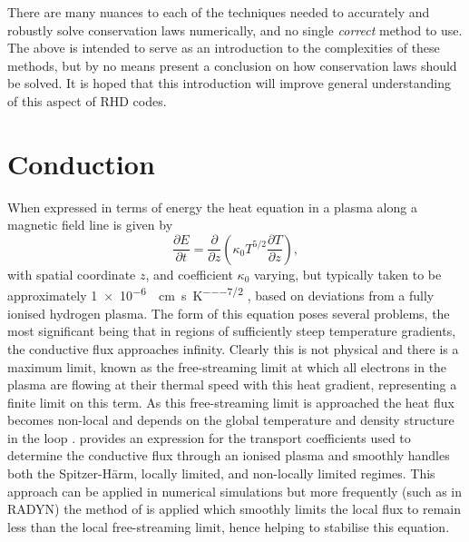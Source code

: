 There are many nuances to each of the techniques needed to accurately and robustly solve conservation laws numerically, and no single \emph{correct} method to use.
The above is intended to serve as an introduction to the complexities of these methods, but by no means present a conclusion on how conservation laws should be solved.
It is hoped that this introduction will improve general understanding of this aspect of RHD codes.

\section{Conduction}

When expressed in terms of energy the heat equation in a plasma along a magnetic field line is given by
\begin{equation}
    \frac{\partial E}{\partial t} = \frac{\partial}{\partial z}\left( \kappa_0 T^{5/2} \frac{\partial T}{\partial z} \right),
\end{equation}
with spatial coordinate $z$, and coefficient $\kappa_0$ varying, but typically taken to be approximately \SI{1e-6}{\erg\per\centi\metre\per\second\per\kelvin\tothe{7/2}} \citep{Spitzer1953,Braginskii1965}, based on deviations from a fully ionised hydrogen plasma.
The form of this equation poses several problems, the most significant being that in regions of sufficiently steep temperature gradients, the conductive flux approaches infinity.
Clearly this is not physical and there is a maximum limit, known as the free-streaming limit at which all electrons in the plasma are flowing at their thermal speed with this heat gradient, representing a finite limit on this term.
As this free-streaming limit is approached the heat flux becomes non-local and depends on the global temperature and density structure in the loop \citep{Battaglia2009}.
\citet{Campbell1984} provides an expression for the transport coefficients used to determine the conductive flux through an ionised plasma and smoothly handles both the Spitzer-H\"{a}rm, locally limited, and non-locally limited regimes.
This approach can be applied in numerical simulations but more frequently (such as in RADYN) the method of \citet{FISHER1985} is applied which smoothly limits the local flux to remain less than the local free-streaming limit, hence helping to stabilise this equation.

